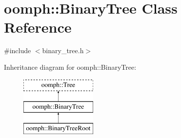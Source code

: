 \hypertarget{classoomph_1_1BinaryTree}{}\section{oomph\+:\+:Binary\+Tree Class Reference}
\label{classoomph_1_1BinaryTree}


{\ttfamily \#include $<$binary\+\_\+tree.\+h$>$}

Inheritance diagram for oomph\+:\+:Binary\+Tree\+:\begin{figure}[H]
\begin{center}
\leavevmode
\includegraphics[height=3.000000cm]{classoomph_1_1BinaryTree}
\end{center}
\end{figure}

